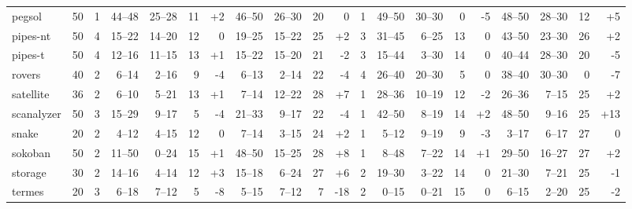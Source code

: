 \documentclass{article}
\begin{document}
\begin{table}
\begin{tabular}{l@{}rr|rrrr|rrrr|r|rrrr|rrrr}
        pegsol &     50 &   1 &   44--48 &  25--28 &  11 &  {\color{blue}+2} &   46--50 &  26--30 &  20 &                  0 &   1 &    49--50 &  30--30 &   0 &    {\color{red}-5} &    48--50 &  28--30 &  12 &   {\color{blue}+5} \\
      pipes-nt &     50 &   4 &   15--22 &  14--20 &  12 &                 0 &   19--25 &  15--22 &  25 &   {\color{blue}+2} &   3 &    31--45 &   6--25 &  13 &                  0 &    43--50 &  23--30 &  26 &   {\color{blue}+2} \\
       pipes-t &     50 &   4 &   12--16 &  11--15 &  13 &  {\color{blue}+1} &   15--22 &  15--20 &  21 &    {\color{red}-2} &   3 &    15--44 &   3--30 &  14 &                  0 &    40--44 &  28--30 &  20 &    {\color{red}-5} \\
        rovers &     40 &   2 &    6--14 &   2--16 &   9 &   {\color{red}-4} &    6--13 &   2--14 &  22 &    {\color{red}-4} &   4 &    26--40 &  20--30 &   5 &                  0 &    38--40 &  30--30 &   0 &    {\color{red}-7} \\
     satellite &     36 &   2 &    6--10 &   5--21 &  13 &  {\color{blue}+1} &    7--14 &  12--22 &  28 &   {\color{blue}+7} &   1 &    28--36 &  10--19 &  12 &    {\color{red}-2} &    26--36 &   7--15 &  25 &   {\color{blue}+2} \\
    scanalyzer &     50 &   3 &   15--29 &   9--17 &   5 &   {\color{red}-4} &   21--33 &   9--17 &  22 &    {\color{red}-4} &   1 &    42--50 &   8--19 &  14 &   {\color{blue}+2} &    48--50 &   9--16 &  25 &  {\color{blue}+13} \\
         snake &     20 &   2 &    4--12 &   4--15 &  12 &                 0 &    7--14 &   3--15 &  24 &   {\color{blue}+2} &   1 &     5--12 &   9--19 &   9 &    {\color{red}-3} &     3--17 &   6--17 &  27 &                  0 \\
       sokoban &     50 &   2 &   11--50 &   0--24 &  15 &  {\color{blue}+1} &   48--50 &  15--25 &  28 &   {\color{blue}+8} &   1 &     8--48 &   7--22 &  14 &   {\color{blue}+1} &    29--50 &  16--27 &  27 &   {\color{blue}+2} \\
       storage &     30 &   2 &   14--16 &   4--14 &  12 &  {\color{blue}+3} &   15--18 &   6--24 &  27 &   {\color{blue}+6} &   2 &    19--30 &   3--22 &  14 &                  0 &    21--30 &   7--21 &  25 &    {\color{red}-1} \\
        termes &     20 &   3 &    6--18 &   7--12 &   5 &   {\color{red}-8} &    5--15 &   7--12 &   7 &   {\color{red}-18} &   2 &     0--15 &   0--21 &  15 &                  0 &     6--15 &   2--20 &  25 &    {\color{red}-2} \\

\end{tabular}
\end{table}
\end{document}
